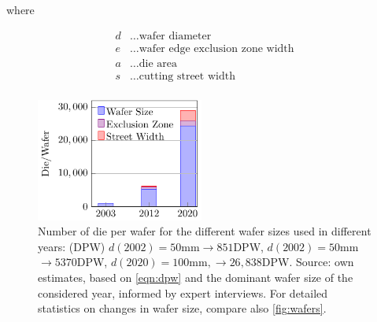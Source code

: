 \documentclass[10pt]{article}
\begin{document}
where

\begin{align*}
    d &\dots \text{wafer diameter} \\
    e &\dots \text{wafer edge exclusion zone width} \\
    a &\dots \text{die area} \\
    s &\dots \text{cutting street width} \\
\end{align*}

\begin{figure}[h!]
    \centering
    \includegraphics[width=5.5cm]{./figures/die-per-wafer.pdf}
    \caption{Number of die per wafer for the different wafer sizes used in different years: (DPW) $d(2002)=50$mm$\rightarrow851$DPW, $d(2002)=50$mm$\rightarrow5370$DPW, $d(2020)=100$mm$, \rightarrow26,838$DPW. Source: own estimates, based on \cref{eqn:dpw} and the dominant wafer size of the considered year, informed by expert interviews. For detailed statistics on changes in wafer size, compare also \cref{fig:wafers}.}
    \label{fig:dpw}
\end{figure}
\end{document}
